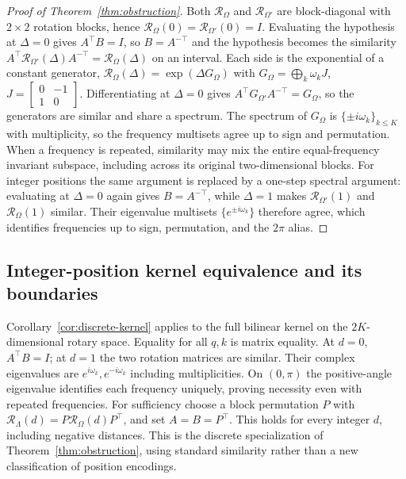 \begin{proof}[Proof of Theorem~\ref{thm:obstruction}]
Both $\mathcal R_\Omega$ and $\mathcal R_{\Omega'}$ are block-diagonal with $2\times2$ rotation
blocks, hence $\mathcal R_\Omega(0)=\mathcal R_{\Omega'}(0)=I$. Evaluating the hypothesis at
$\Delta{=}0$ gives $A^\top B=I$, so $B=A^{-\top}$ and the hypothesis becomes the
similarity $A^\top \mathcal R_{\Omega'}(\Delta)A^{-\top}=\mathcal R_\Omega(\Delta)$ on an interval.
Each side is the exponential of a constant generator, $\mathcal R_\Omega(\Delta)=\exp(\Delta G_\Omega)$
with $G_\Omega=\bigoplus_k \omega_k J$, $J=\left[\begin{smallmatrix}0&-1\\1&0\end{smallmatrix}\right]$.
Differentiating at $\Delta{=}0$ gives $A^\top G_{\Omega'}A^{-\top}=G_\Omega$, so
the generators are similar and share a spectrum. The spectrum of $G_\Omega$ is
$\{\pm i\omega_k\}_{k\le K}$ with multiplicity, so the frequency multisets agree
up to sign and permutation. When a frequency is repeated, similarity may mix
the entire equal-frequency invariant subspace, including across its original
two-dimensional blocks. For integer positions the same argument
is replaced by a one-step spectral argument: evaluating at $\Delta=0$ again
gives $B=A^{-\top}$, while $\Delta=1$ makes $\mathcal R_{\Omega'}(1)$ and
$\mathcal R_\Omega(1)$ similar. Their eigenvalue multisets
$\{e^{\pm i\omega_k}\}$ therefore agree, which identifies frequencies up to
sign, permutation, and the $2\pi$ alias.
\end{proof}


\subsection{Integer-position kernel equivalence and its boundaries}
\label{sec:discrete-kernel-proof}
Corollary~\ref{cor:discrete-kernel} applies to the full bilinear kernel on the
$2K$-dimensional rotary space. Equality for all $q,k$ is matrix equality.
At $d=0$, $A^\top B=I$; at $d=1$ the two rotation matrices are similar.
Their complex eigenvalues are $e^{i\omega_k},e^{-i\omega_k}$ including
multiplicities. On $(0,\pi)$ the positive-angle eigenvalue identifies each
frequency uniquely, proving necessity even with repeated frequencies.
For sufficiency choose a block permutation $P$ with
$\mathcal R_\Lambda(d)=P\mathcal R_\Omega(d)P^\top$, and set
$A=B=P^\top$. This holds for every integer $d$, including negative distances.
This is the discrete specialization of Theorem~\ref{thm:obstruction}, using
standard similarity rather than a new classification of position encodings.


